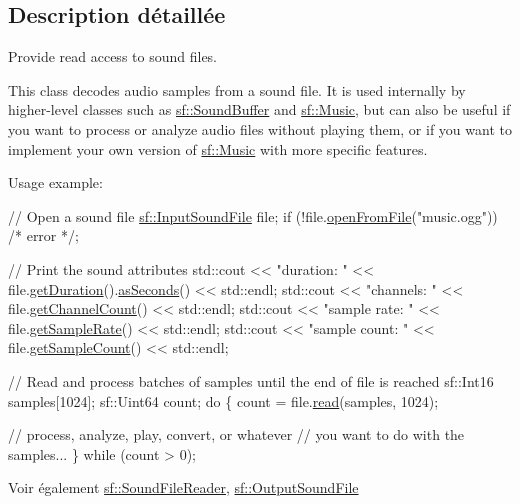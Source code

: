 \subsection{Description détaillée}
Provide read access to sound files. 

This class decodes audio samples from a sound file. It is used internally by higher-\/level classes such as \hyperlink{classsf_1_1SoundBuffer}{sf\+::\+Sound\+Buffer} and \hyperlink{classsf_1_1Music}{sf\+::\+Music}, but can also be useful if you want to process or analyze audio files without playing them, or if you want to implement your own version of \hyperlink{classsf_1_1Music}{sf\+::\+Music} with more specific features.

Usage example\+: 
\begin{DoxyCode}
\textcolor{comment}{// Open a sound file}
\hyperlink{classsf_1_1InputSoundFile}{sf::InputSoundFile} file;
\textcolor{keywordflow}{if} (!file.\hyperlink{classsf_1_1InputSoundFile_af68e54bc9bfac19554c84601156fe93f}{openFromFile}(\textcolor{stringliteral}{"music.ogg"}))
    \textcolor{comment}{/* error */};

\textcolor{comment}{// Print the sound attributes}
std::cout << \textcolor{stringliteral}{"duration: "} << file.\hyperlink{classsf_1_1InputSoundFile_aa081bd4d9732408d10b48227a360778e}{getDuration}().\hyperlink{classsf_1_1Time_aa3df2f992d0b0041b4eb02258d43f0e3}{asSeconds}() << std::endl;
std::cout << \textcolor{stringliteral}{"channels: "} << file.\hyperlink{classsf_1_1InputSoundFile_a54307c308ba05dea63aba54a29c804a4}{getChannelCount}() << std::endl;
std::cout << \textcolor{stringliteral}{"sample rate: "} << file.\hyperlink{classsf_1_1InputSoundFile_a6b8177e40dd8020752f6d52f96b774c3}{getSampleRate}() << std::endl;
std::cout << \textcolor{stringliteral}{"sample count: "} << file.\hyperlink{classsf_1_1InputSoundFile_a665b7fed6cdca3e0c622909e5a6655e4}{getSampleCount}() << std::endl;

\textcolor{comment}{// Read and process batches of samples until the end of file is reached}
sf::Int16 samples[1024];
sf::Uint64 count;
\textcolor{keywordflow}{do}
\{
    count = file.\hyperlink{classsf_1_1InputSoundFile_a83d6f64617456601edeb0daf9d14a17f}{read}(samples, 1024);

    \textcolor{comment}{// process, analyze, play, convert, or whatever}
    \textcolor{comment}{// you want to do with the samples...}
\}
\textcolor{keywordflow}{while} (count > 0);
\end{DoxyCode}


\begin{DoxySeeAlso}{Voir également}
\hyperlink{classsf_1_1SoundFileReader}{sf\+::\+Sound\+File\+Reader}, \hyperlink{classsf_1_1OutputSoundFile}{sf\+::\+Output\+Sound\+File} 
\end{DoxySeeAlso}


